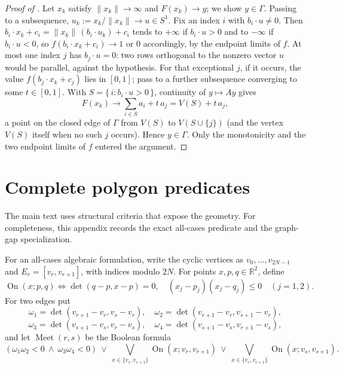 \documentclass[11pt,twoside,leqno]{article}
\theoremstyle{plain}
\theoremstyle{definition}
\theoremstyle{remark}
\newcommand{\R}{\mathbb{R}}
\newcommand{\norm}[1]{\lVert #1 \rVert}
\begin{document}
\begin{proof}[Proof of ]
Let $x_k$ satisfy $\norm{x_k}\to\infty$ and $F(x_k)\to y$; we show $y\in\Gamma$. Passing to a subsequence, $u_k:=x_k/\norm{x_k}\to u\in S^1$. Fix an index $i$ with $b_i\cdot u\neq0$. Then $b_i\cdot x_k+c_i=\norm{x_k}\,(b_i\cdot u_k)+c_i$ tends to $+\infty$ if $b_i\cdot u>0$ and to $-\infty$ if $b_i\cdot u<0$, so $f(b_i\cdot x_k+c_i)\to 1$ or $0$ accordingly, by the endpoint limits of $f$. At most one index $j$ has $b_j\cdot u=0$: two rows orthogonal to the nonzero vector $u$ would be parallel, against the hypothesis. For that exceptional $j$, if it occurs, the value $f(b_j\cdot x_k+c_j)$ lies in $[0,1]$; pass to a further subsequence converging to some $t\in[0,1]$. With $S=\{\,i:b_i\cdot u>0\,\}$, continuity of $y\mapsto Ay$ gives
\[
F(x_k)\longrightarrow \sum_{i\in S} a_i + t\,a_j = V(S)+t\,a_j,
\]
a point on the closed edge of $\Gamma$ from $V(S)$ to $V(S\cup\{j\})$ (and the vertex $V(S)$ itself when no such $j$ occurs). Hence $y\in\Gamma$. Only the monotonicity and the two endpoint limits of $f$ entered the argument.
\end{proof}

\section{Complete polygon predicates}\label{app:polygon-criteria}

The main text uses structural criteria that expose the geometry.  For completeness, this appendix records the exact all-cases predicate and the graph-gap specialization.

For an all-cases algebraic formulation, write the cyclic vertices as $v_0,\ldots,v_{2N-1}$ and $E_r=[v_r,v_{r+1}]$, with indices modulo $2N$. For points $x,p,q\in\R^2$, define
\[
 \operatorname{On}(x;p,q)
 \iff
 \det(q-p,x-p)=0,
 \quad
 (x_j-p_j)(x_j-q_j)\le0\quad(j=1,2).
\]
For two edges put
\[
 \omega_1=\det(v_{r+1}-v_r,v_s-v_r),\quad
 \omega_2=\det(v_{r+1}-v_r,v_{s+1}-v_r),
\]
\[
 \omega_3=\det(v_{s+1}-v_s,v_r-v_s),\quad
 \omega_4=\det(v_{s+1}-v_s,v_{r+1}-v_s),
\]
and let $\operatorname{Meet}(r,s)$ be the Boolean formula
\[
 (\omega_1\omega_2<0\ \wedge\ \omega_3\omega_4<0)
 \ \vee\
 \bigvee_{x\in\{v_s,v_{s+1}\}}\operatorname{On}(x;v_r,v_{r+1})
 \ \vee\
 \bigvee_{x\in\{v_r,v_{r+1}\}}\operatorname{On}(x;v_s,v_{s+1}).
\]
\end{document}
